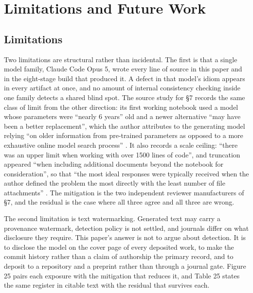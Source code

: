 \section{Limitations and Future Work}
\label{sec:limitations}

\subsection{Limitations}

Two limitations are structural rather than incidental. The first is that a
single model family, Claude Code Opus 5, wrote every line of source in this
paper and in the eight-stage build that produced it. A defect in that model's
idiom appears in every artifact at once, and no amount of internal consistency
checking inside one family detects a shared blind spot. The source study for \S7
records the same class of limit from the other direction: its first working
notebook used a model whose parameters were ``nearly 6 years'' old and a newer
alternative ``may have been a better replacement'', which the author attributes
to the generating model relying ``on older information from pre-trained
parameters as opposed to a more exhaustive online model search process''
\cite{aiprgliomatc}. It also records a scale ceiling: ``there was an upper limit
when working with over 1500 lines of code'', and truncation appeared ``when
including additional documents beyond the notebook for consideration'', so that
``the most ideal responses were typically received when the author defined the
problem the most directly with the least number of file attachments''
\cite{aiprgliomatc}. The mitigation is the two independent reviewer
manufacturers of \S7, and the residual is the case where all three agree and all
three are wrong.

The second limitation is text watermarking. Generated text may carry a
provenance watermark, detection policy is not settled, and journals differ on
what disclosure they require. This paper's answer is not to argue about
detection. It is to disclose the model on the cover page of every deposited
work, to make the commit history rather than a claim of authorship the primary
record, and to deposit to a repository and a preprint rather than through a
journal gate. Figure 25 pairs each exposure with the mitigation that reduces it,
and Table 25 states the same register in citable text with the residual that
survives each.

